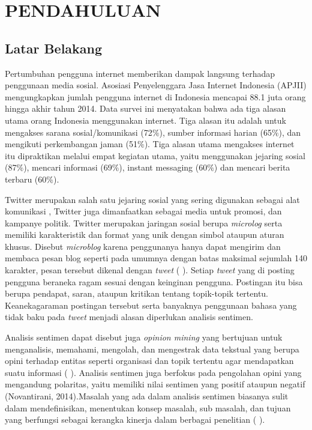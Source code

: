 \section*{PENDAHULUAN} %
\subsection*{Latar Belakang}
Pertumbuhan pengguna internet memberikan dampak langsung terhadap penggunaan media sosial. Asosiasi Penyelenggara Jasa Internet Indonesia (APJII) mengungkapkan jumlah pengguna internet di Indonesia mencapai 88.1 juta orang hingga akhir tahun 2014. Data survei ini menyatakan bahwa ada tiga alasan utama orang Indonesia menggunakan internet. Tiga alasan itu adalah untuk mengakses sarana sosial/komunikasi (72$\%$), sumber informasi harian (65$\%$), dan mengikuti perkembangan jaman (51$\%$). Tiga alasan utama mengakses internet itu dipraktikan melalui empat kegiatan utama, yaitu menggunakan jejaring sosial (87$\%$), mencari informasi (69$\%$), instant messaging (60$\%$) dan mencari berita terbaru (60$\%$).

Twitter merupakan salah satu jejaring sosial yang sering digunakan sebagai alat komunikasi , Twitter juga dimanfaatkan sebagai media untuk promosi, dan kampanye politik. Twitter merupakan jaringan sosial berupa \textit{microlog} serta memiliki karakteristik dan format yang unik dengan simbol ataupun aturan khusus. Disebut \textit{microblog} karena penggunanya hanya dapat mengirim dan membaca pesan blog seperti pada umumnya dengan batas maksimal sejumlah 140 karakter, pesan tersebut dikenal dengan \textit{tweet} (\citeauthor{ZHANG2011} \cite*{ZHANG2011}). Setiap \textit{tweet} yang di posting pengguna beraneka ragam sesuai dengan keinginan pengguna. Postingan itu bisa berupa pendapat, saran, ataupun kritikan tentang topik-topik tertentu. Keanekagaraman postingan tersebut serta banyaknya penggunaan bahasa yang tidak baku pada \textit{tweet} menjadi alasan diperlukan analisis sentimen.

Analisis sentimen dapat disebut juga \textit{opinion mining} yang bertujuan untuk menganalisis, memahami, mengolah, dan mengestrak data tekstual yang berupa opini terhadap entitas seperti organisasi dan topik tertentu agar mendapatkan suatu informasi (\citeauthor{LIU2010} \cite*{LIU2010}). Analisis sentimen juga berfokus pada pengolahan opini yang mengandung polaritas, yaitu memiliki nilai sentimen yang positif ataupun negatif (Novantirani, 2014).Masalah yang ada dalam analisis sentimen biasanya sulit dalam mendefinisikan, menentukan konsep masalah, sub masalah, dan tujuan yang berfungsi sebagai kerangka kinerja dalam berbagai penelitian (\citeauthor{LIU2010} \cite*{LIU2010}).

